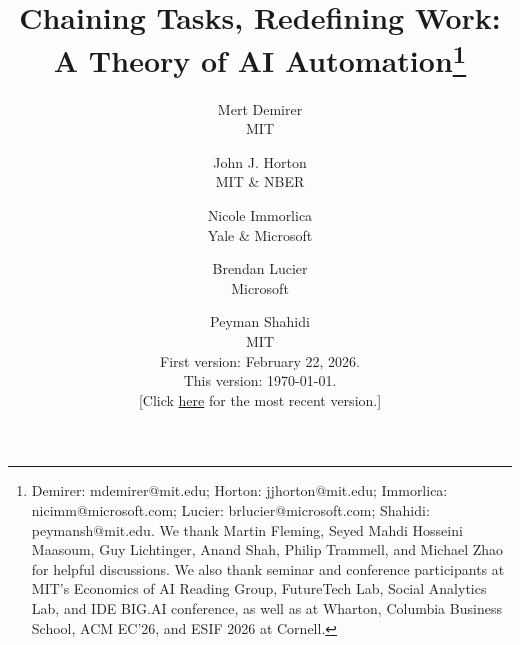 \documentclass[11pt]{article}
\theoremstyle{plain}
\theoremstyle{plain}
\theoremstyle{definition} %
\begin{document}

\title{Chaining Tasks, Redefining Work: A Theory of AI Automation\thanks{Demirer: \mbox{mdemirer@mit.edu}; Horton: \mbox{jjhorton@mit.edu}; Immorlica: \mbox{nicimm@microsoft.com}; Lucier: \mbox{brlucier@microsoft.com}; Shahidi: \mbox{peymansh@mit.edu}. We thank Martin Fleming, Seyed Mahdi Hosseini Maasoum, Guy Lichtinger, Anand Shah, Philip Trammell, and Michael Zhao for helpful discussions. We also thank seminar and conference participants at MIT's Economics of AI Reading Group, FutureTech Lab, Social Analytics Lab, and IDE BIG.AI conference, as well as at Wharton, Columbia Business School, ACM EC'26, and ESIF 2026 at Cornell.}}

\author{
Mert Demirer \\ MIT
\and
John J. Horton \\ MIT \& NBER
\and
Nicole Immorlica \\ Yale \& Microsoft
\and
Brendan Lucier \\ Microsoft
\and
Peyman Shahidi \\ MIT
\\[1em]
{\normalsize First version: February 22, 2026.}
\\
{\normalsize This version: \today.}
\\[0.5em]
{
{\color[RGB]{0,51,153}[Click \href{https://peymanshahidi.github.io/assets/pdf/chaining_tasks_ai_automation.pdf}{here} for the most recent version.]}
}
\\
}



\date{}


\newcommand{\T}[0]{\mathcal{T}}
\newcommand{\J}[0]{\mathcal{J}}

\newcommand{\manualLetter}{M}
\newcommand{\AIletter}{A}
\newcommand{\handoffLetter}{H}
\newcommand{\skillCostLetter}{c}
\newcommand{\timeCostLetter}{t}
\newcommand{\laborLetter}{l}
\newcommand{\skillAdjustedTimeLetter}{\ensuremath{\tau}}
\newcommand{\aggregateManualLabor}{M}
\newcommand{\aggregateAIlabor}{A}

\newcommand{\timecost}[1]{\ensuremath{\timeCostLetter_{#1}}}
\newcommand{\skillcost}[1]{\ensuremath{\skillCostLetter_{#1}}}
\newcommand{\hccost}[1]{\skillcost{#1}}
\newcommand{\labor}[1]{\ensuremath{\laborLetter_{#1}}}
\newcommand{\handofftime}[1]{\ensuremath{\timeCostLetter^{\handoffLetter}_{#1}}}
\end{document}
